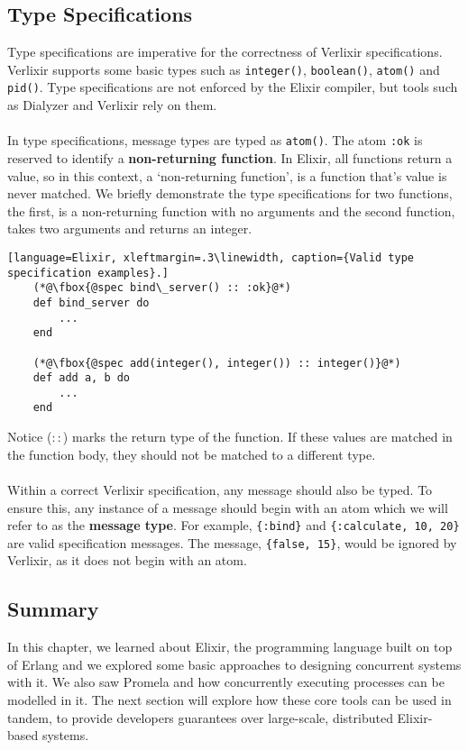 \subsection{Type Specifications}
Type specifications are imperative for the correctness of Verlixir specifications. Verlixir supports some basic types such as \texttt{integer()}, \texttt{boolean()}, \texttt{atom()} and \texttt{pid()}. Type specifications are not enforced by the Elixir compiler, but tools such as Dialyzer and Verlixir rely on them.
\\ \\
In type specifications, message types are typed as \texttt{atom()}. The atom \texttt{:ok} is reserved to identify a \textbf{non-returning function}. In Elixir, all functions return a value, so in this context, a `non-returning function', is a function that's value is never matched. We briefly demonstrate the type specifications for two functions, the first, is a non-returning function with no arguments and the second function, takes two arguments and returns an integer.
\begin{lstlisting}[language=Elixir, xleftmargin=.3\linewidth, caption={Valid type specification examples}.]
    (*@\fbox{@spec bind\_server() :: :ok}@*)
    def bind_server do
        ...
    end

    (*@\fbox{@spec add(integer(), integer()) :: integer()}@*)
    def add a, b do
        ...
    end
\end{lstlisting}
Notice ($::$) marks the return type of the function. If these values are matched in the function body, they should not be matched to a different type.
\\ \\
Within a correct Verlixir specification, any message should also be typed. To ensure this, any instance of a message should begin with an atom which we will refer to as the \textbf{message type}. For example, \texttt{\{:bind\}} and \texttt{\{:calculate, 10, 20\}} are valid specification messages. The message, \texttt{\{false, 15\}}, would be ignored by Verlixir, as it does not begin with an atom. 
\subsection{Summary}
In this chapter, we learned about Elixir, the programming language built on top of Erlang and we explored some basic approaches to designing concurrent systems with it. We also saw Promela and how concurrently executing processes can be modelled in it. The next section will explore how these core tools can be used in tandem, to provide developers guarantees over large-scale, distributed Elixir-based systems.